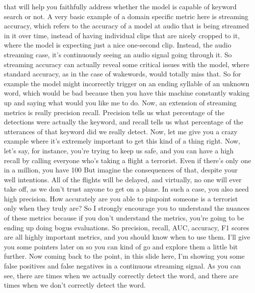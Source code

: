 {{{{     that will help you faithfully address whether the model is
     capable of keyword search or not.
     A very basic example of a domain specific metric
     here is streaming accuracy, which refers to the accuracy of a model at audio
     that is being streamed in it over time, instead
     of having individual clips that are nicely
     cropped to it, where the model is expecting just a nice one-second clip.
     Instead, the audio streaming case, it's continuously
     seeing an audio signal going through it.
     So streaming accuracy can actually reveal some critical issues
     with the model, where standard accuracy, as in the case of wakewords,
     would totally miss that.
     So for example the model might incorrectly
     trigger on an ending syllable of an unknown word, which
     would be bad because then you have this machine constantly waking up
     and saying what would you like me to do.
     Now, an extension of streaming metrics is really precision recall.
     Precision tells us what percentage of the detections
     were actually the keyword, and recall tells us
     what percentage of the utterances of that keyword did we really detect.
     Now, let me give you a crazy example where it's extremely important
     to get this kind of a thing right.
     Now, let's say, for instance, you're trying to keep us safe,
     and you can have a high recall by calling everyone
     who's taking a flight a terrorist.
     Even if there's only one in a million, you have 100%
     But imagine the consequences of that, despite your well intentions.
     All of the flights will be delayed, and virtually, no one
     will ever take off, as we don't trust anyone to get on a plane.
     In such a case, you also need high precision.
     How accurately are you able to pinpoint someone is
     a terrorist only when they truly are?
     So I strongly encourage you to understand the nuances of these metrics
     because if you don't understand the metrics,
     you're going to be ending up doing bogus evaluations.
     So precision, recall, AUC, accuracy, F1 scores
     are all highly important metrics, and you should know when to use them.
     I'll give you some pointers later on so you can kind of go and explore them
     a little bit further.
     Now coming back to the point, in this slide here,
     I'm showing you some false positives and false negatives
     in a continuous streaming signal.
     As you can see, there are times when we actually correctly detect the word,
     and there are times when we don't correctly detect the word.
}}}}
